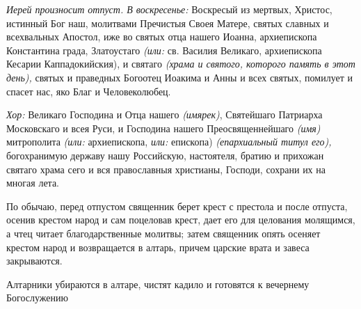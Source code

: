 \begin{mymulticols}
{\itshape Иерей произносит отпуст. В воскресенье:} Воскресый из мертвых, Христос, истинный Бог наш, молитвами Пречистыя Своея Матере, святых славных и всехвальных Апостол, иже во святых отца нашего Иоанна, архиепископа Константина града, Златоустаго {\itshape (или:} св. Василия Великаго, архиепископа Кесарии Каппадокийския), и святаго {\itshape (храма и святого, которого память в этот день),} святых и праведных Богоотец Иоакима и Анны и всех святых, помилует и спасет нас, яко Благ и Человеколюбец.


{\itshape Хор:} Великаго Господина и Отца нашего {\itshape (имярек)}, Святейшаго Патриарха Московскаго и всея Руси, и Господина нашего Преосвященнейшаго {\itshape (имя)} митрополита {\itshape (или:} архиепископа, {\itshape или:} епископа) {\itshape (епархиальный титул его),} богохранимую державу нашу Российскую, настоятеля, братию и прихожан святаго храма сего и вся православныя христианы, Господи, сохрани их на многая лета.

По обычаю, перед отпустом священник берет крест с престола и после отпуста, осенив крестом народ и сам поцеловав крест, дает его для целования молящимся, а чтец читает благодарственные молитвы; затем священник опять осеняет крестом народ и возвращается в алтарь, причем царские врата и завеса закрываются.

Алтарники убираются в алтаре, чистят кадило и готовятся к вечернему Богослужению

\end{mymulticols}

\mychapterending

